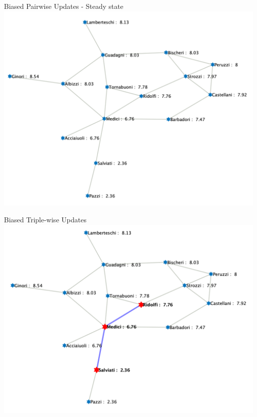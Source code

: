 \documentclass[usenames,dvipsnames,10pt]{beamer}
\theoremstyle{remark}
\begin{document}
\begin{frame}{Biased Pairwise Updates - Steady state}
\centering
    \includegraphics[scale=.18]{../Figures/introP10.png}
\end{frame}

\begin{frame}{Biased Triple-wise Updates}
    \includegraphics[scale=.18]{../Figures/introP32.png}
\end{frame}
\end{document}
